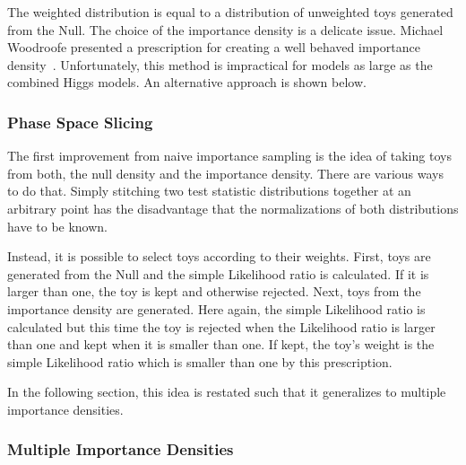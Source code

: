 The weighted distribution is equal to a distribution of unweighted toys generated from the Null. The choice of the importance density is a delicate issue. Michael Woodroofe presented a prescription for creating a well behaved importance density~\cite{Woodroofe}. Unfortunately, this method is impractical for models as large as the combined Higgs models. An alternative approach is shown below.


\subsubsection{Phase Space Slicing}
The first improvement from naive importance sampling is the idea of taking toys from both, the null density and the importance density. There are various ways to do that. Simply stitching two test statistic distributions together at an arbitrary point has the disadvantage that the normalizations of both distributions have to be known.


Instead, it is possible to select toys according to their weights. First, toys are generated from the Null and the simple Likelihood ratio is calculated. If it is larger than one, the toy is kept and otherwise rejected. Next, toys from the importance density are generated. Here again, the simple Likelihood ratio is calculated but this time the toy is rejected when the Likelihood ratio is larger than one and kept when it is smaller than one. If kept, the toy's weight is the simple Likelihood ratio which is smaller than one by this prescription.


In the following section, this idea is restated such that it generalizes to multiple importance densities.


\subsubsection{Multiple Importance Densities}


